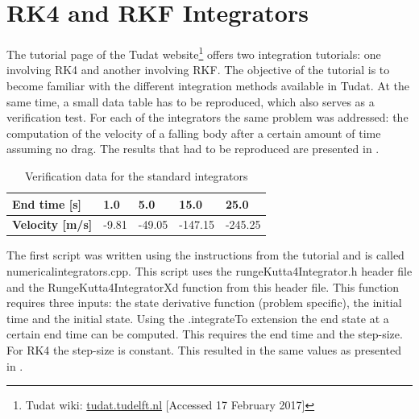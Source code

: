 \section{\acs{RK4} and \acs{RKF} Integrators}
\label{sec:rkandrkfver}
The tutorial page of the \ac{Tudat} website\footnote{\label{foot:tudatWiki2} Tudat wiki: \url{tudat.tudelft.nl} [Accessed 17 February 2017] } offers two integration tutorials: one involving \ac{RK4} and another involving \ac{RKF}. The objective of the tutorial is to become familiar with the different integration methods available in \ac{Tudat}. At the same time, a small data table has to be reproduced, which also serves as a verification test. For each of the integrators the same problem was addressed: the computation of the velocity of a falling body after a certain amount of time assuming no drag. The results that had to be reproduced are presented in .


\begin{table}[H]
\begin{center}
\caption{Verification data for the standard integrators}
\label{tab:intverdat}
\begin{tabular}{|l|l|l|l|l|}
\hline 
\textbf{End time [s]} & 1.0	& 5.0 & 15.0 & 25.0 \\ \hline 
\textbf{Velocity [m/s]} & -9.81 & -49.05 & -147.15 & -245.25 \\ \hline
\end{tabular}
\end{center}
\end{table}

\noindent
The first script was written using the instructions from the tutorial and is called numericalintegrators.cpp. This script uses the rungeKutta4Integrator.h header file and the RungeKutta4IntegratorXd function from this header file. This function requires three inputs: the state derivative function (problem specific), the initial time and the initial state. Using the .integrateTo extension the end state at a certain end time can be computed. This requires the end time and the step-size. For \ac{RK4} the step-size is constant. This resulted in the same values as presented in .\\

